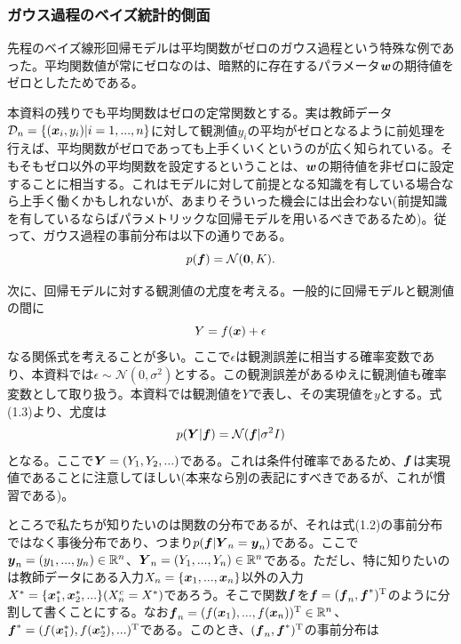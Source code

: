 \documentclass[dvipdfmx, 9pt, a4paper]{jsarticle}
\numberwithin{equation}{section}
\newcommand{\bm}[1]{{\mbox{\boldmath $#1$}}}
\begin{document}
\subsubsection{ガウス過程のベイズ統計的側面}
先程のベイズ線形回帰モデルは平均関数がゼロのガウス過程という特殊な例であった。平均関数値が常にゼロなのは、暗黙的に存在するパラメータ$\bm w$の期待値をゼロとしたためである。\par
本資料の残りでも平均関数はゼロの定常関数とする。実は教師データ$\mathcal{D}_n=\{(\bm x_i, y_i)|i=1, ..., n\}$に対して観測値$y_i$の平均がゼロとなるように前処理を行えば、平均関数がゼロであっても上手くいくというのが広く知られている。そもそもゼロ以外の平均関数を設定するということは、$\bm w$の期待値を非ゼロに設定することに相当する。これはモデルに対して前提となる知識を有している場合なら上手く働くかもしれないが、あまりそういった機会には出会わない(前提知識を有しているならばパラメトリックな回帰モデルを用いるべきであるため)。従って、ガウス過程の事前分布は以下の通りである。
\begin{equation}
p(\bm f)=\mathcal{N}(\bm 0, K).
\end{equation}\par
次に、回帰モデルに対する観測値の尤度を考える。一般的に回帰モデルと観測値の間に
\begin{equation}
Y=f(\bm x) + \epsilon
\end{equation}
なる関係式を考えることが多い。ここで$\epsilon$は観測誤差に相当する確率変数であり、本資料では$\epsilon \sim \mathcal{N}(0, \sigma^2)$とする。この観測誤差があるゆえに観測値も確率変数として取り扱う。本資料では観測値を$Y$で表し、その実現値を$y$とする。式(1.3)より、尤度は
\begin{equation}
p(\bm Y|\bm f)=\mathcal{N}(\bm f|\sigma^2I)
\end{equation}
となる。ここで$\bm Y=(Y_1, Y_2, ...)$である。これは条件付確率であるため、$\bm f$は実現値であることに注意してほしい(本来なら別の表記にすべきであるが、これが慣習である)。\par
ところで私たちが知りたいのは関数の分布であるが、それは式(1.2)の事前分布ではなく事後分布であり、つまり$p(\bm f|\bm Y_n=\bm y_n)$である。ここで$\bm y_n=(y_1, ..., y_n) \in \mathbb{R}^n$、$\bm Y_n=(Y_1, ..., Y_n) \in \mathbb{R}^n$である。ただし、特に知りたいのは教師データにある入力$X_n=\{\bm x_1, ..., \bm x_n\}$以外の入力$X^*=\{\bm x^*_1, \bm x^*_2, ...\}(X_n^c=X^*)$であろう。そこで関数$\bm f$を$\bm f=(\bm f_n, \bm f^*)^{\rm T}$のように分割して書くことにする。なお$\bm f_n=(f(\bm x_1), ..., f(\bm x_n))^{\rm T} \in \mathbb{R}^n$、$\bm f^*=(f(\bm x^*_1), f(\bm x^*_2), ...)^{\rm T}$である。このとき、$(\bm f_n, \bm f^*)^{\rm T}$の事前分布は
\end{document}
